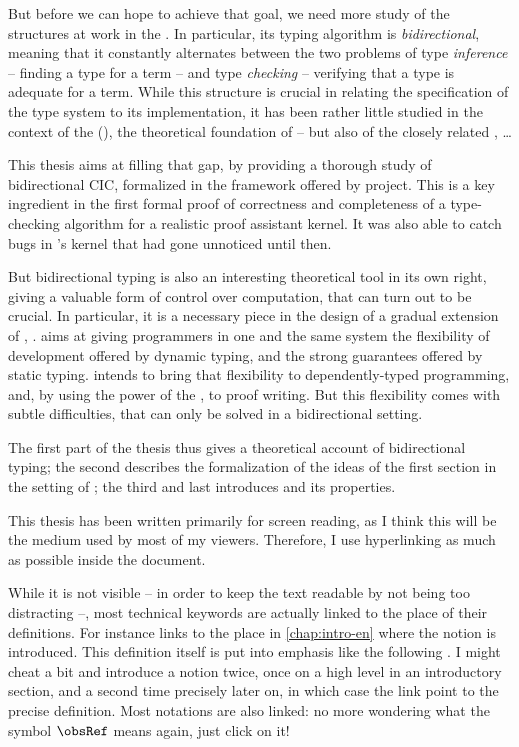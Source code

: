 But before we can hope to achieve that goal, we need more study of the structures at work
in the . In particular, its typing algorithm is \emph{bidirectional}, meaning that
it constantly alternates between the two problems of type \emph{inference} – finding a type for
a term – and type \emph{checking} – verifying that a type is adequate for a term. While this
structure is crucial in relating the specification of the type system to its implementation,
it has been rather little studied in the context of the 
(), the theoretical foundation of  – but also of the closely related
, …

This thesis aims at filling that gap, by providing a thorough study of bidirectional CIC,
formalized in the framework offered by  project. This is a key
ingredient in the first formal proof of correctness and completeness of a type-checking
algorithm for a realistic proof assistant kernel.
It was also able to catch bugs in ’s kernel that had gone unnoticed until then.

But bidirectional typing is also an interesting theoretical tool in its own right,
giving a valuable form of control over computation, that can turn out to be crucial.
In particular, it is a necessary piece in the design of a gradual extension of
, .
 aims at giving programmers in one and the same system the flexibility of
development offered by dynamic typing, and the strong guarantees offered
by static typing.  intends
to bring that flexibility to dependently-typed programming,
and, by using the power of the , to proof writing.
But this flexibility comes with subtle difficulties, that can only be solved in a bidirectional
setting.

The first part of the thesis thus gives a theoretical account of bidirectional typing; the second
describes the formalization of the ideas of the first section in the setting of ;
the third and last introduces  and its properties.



This thesis has been written primarily for screen reading, as I think this will be the medium
used by most of my viewers. Therefore, I use hyperlinking as much as possible
inside the document.

While it is not visible – in order to keep the text readable by not being too distracting –,
most technical keywords are actually linked to the
place of their definitions. For instance  links to
the place in \cref{chap:intro-en} where the notion is introduced.
This definition itself is put into emphasis like the following .
I might cheat a bit and introduce a notion twice, once on a high level in an introductory
section, and a second time precisely later on, in which case the link point to the precise
definition. Most notations are also linked: no more wondering what the symbol $\obsRef$
means again, just click on it!

